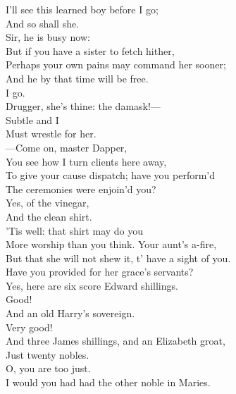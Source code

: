 \documentclass[a4paper,oneside]{memoir}
\begin{document}
\begin{drama*}
I'll see this learned boy before I go;\\
And so shall she.\\
\facespeaks {} Sir, he is busy now:\\
But if you have a sister to fetch hither,\\
Perhaps your own pains may command her sooner;\\
And he by that time will be free.\\
\kastrilspeaks {} I go.\\
\facespeaks Drugger, she's thine: the damask!---\\
 Subtle and I\\
Must wrestle for her.\\
 ---Come on, master Dapper,\\
You see how I turn clients here away,\\
To give your cause dispatch; have you perform'd\\
The ceremonies were enjoin'd you?\\
\dapperspeaks {} Yes, of the vinegar,\\
And the clean shirt.\\
\facespeaks {} 'Tis well: that shirt may do you\\
More worship than you think. Your aunt's a-fire,\\
But that she will not shew it, t' have a sight of you.\\
Have you provided for her grace's servants?\\
\dapperspeaks Yes, here are six score Edward shillings.\\
\facespeaks {} Good!\\
\dapperspeaks And an old Harry's sovereign.\\
\facespeaks {} Very good!\\
\dapperspeaks And three James shillings, and an Elizabeth groat,\\
Just twenty nobles.\\
\facespeaks {} O, you are too just.\\
I would you had had the other noble in Maries.\\

\end{drama*}
\end{document}
